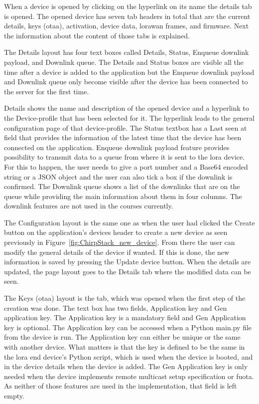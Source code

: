 When a device is opened by clicking on the hyperlink on its name the details tab is opened.
The opened device has seven tab headers in total that are the current details, keys (\gls{otaa}), activation, device data, \gls{lorawan} frames, and firmware.
Next the information about the content of those tabs is explained.

The Details layout has four text boxes called Details, Status, Enqueue downlink payload, and Downlink queue.
The Details and Status boxes are visible all the time after a device is added to the application but the Enqueue downlink payload and Downlink queue only become visible after the device has been connected to the server for the first time.

Details shows the name and description of the opened device and a hyperlink to the Device-profile that has been selected for it.
The hyperlink leads to the general configuration page of that device-profile.
The Status textbox has a Last seen at field that provides the information of the latest time that the device has been connected on the application.
Enqueue downlink payload feature provides possibility to transmit data to a queue from where it is sent to the \gls{lora} device. For this to happen, the user needs to give a port number and a Base64 encoded string or a JSON object and the user can also tick a box if the downlink is confirmed.
The Downlink queue shows  a list of the downlinks that are on the queue while providing the main information about them in four columns.
The downlink features are not used in the courses currently.

The Configuration layout is the same one as when the user had clicked the Create button on the application's devices header to create a new device as seen previously in Figure~\ref{fig:ChirpStack_new_device}.
From there the user can modify the general details of the device if wanted.
If this is done, the new information is saved by pressing the Update device button.
When the details are updated, the page layout goes to the Details tab where the modified data can be seen.

The Keys (\gls{otaa}) layout is the tab, which was opened when the first step of the creation was done.
The text box has two fields, Application key and Gen application key.
The Application key is a mandatory field and Gen Application key is optional.
The Application key can be accessed when a Python main.py file from the device is run.
The Application key can either be unique or the same with another device.
What matters is that the key is defined to be the same in the \gls{lora} end device's Python script, which is used when the device is booted, and in the device details when the device is added.
The Gen Application key is only needed when the device implements remote multicast setup specification or \gls{fuota}.
As neither of those features are used in the implementation, that field is left empty.

